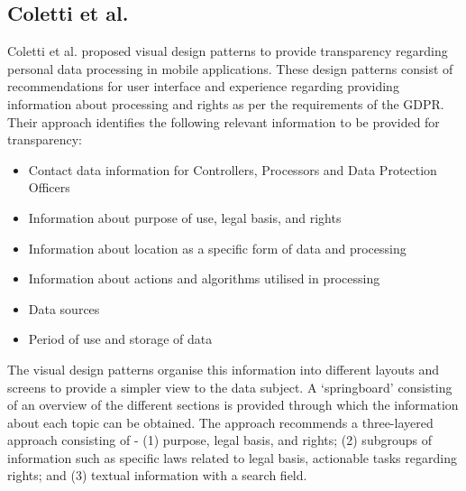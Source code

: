 \subsection{Coletti et al.}
Coletti et al. \cite{kurosu_design_2019} proposed visual design patterns to provide transparency regarding personal data processing in mobile applications. These design patterns consist of recommendations for user interface and experience regarding providing information about processing and rights as per the requirements of the GDPR. Their approach identifies the following relevant information to be provided for transparency: 
\begin{itemize}
    \item Contact data information for Controllers, Processors and Data Protection Officers
    \item Information about purpose of use, legal basis, and rights
    \item Information about location as a specific form of data and processing
    \item Information about actions and algorithms utilised in processing
    \item Data sources 
    \item Period of use and storage of data
\end{itemize}
The visual design patterns organise this information into different layouts and screens to provide a simpler view to the data subject. A `springboard' consisting of an overview of the different sections is provided through which the information about each topic can be obtained. The approach recommends a three-layered approach consisting of - (1) purpose, legal basis, and rights; (2) subgroups of information such as specific laws related to legal basis, actionable tasks regarding rights; and (3) textual information with a search field.

